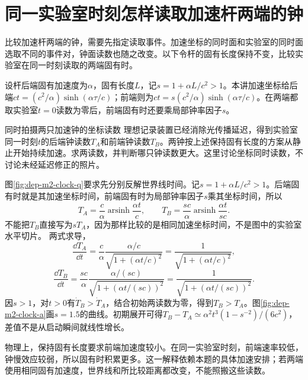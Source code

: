 \section{同一实验室时刻怎样读取加速杆两端的钟}
比较加速杆两端的钟，需要先指定读取事件。加速坐标的同时面和实验室的同时面选取不同的事件对，钟面读数也随之改变。以下令杆的固有长度保持不变，比较实验室在同一时刻读取的两端固有时。

设杆后端固有加速度为$\alpha$，固有长度$L$，记$s=1+\alpha L/c^2>1$。本讲加速坐标给后端$ct=(c^2/\alpha)\sinh(\alpha\tau/c)$；前端则为$ct=s(c^2/\alpha)\sinh(\alpha\tau/c)$。在两端都取实验室$t=0$读数为零后，前端固有时还要乘局部钟率因子$s$。

\begin{example}同时拍摄两只加速钟的坐标读数
理想记录装置已经消除光传播延迟，得到实验室同一时刻$t$的后端钟读数$T_A$和前端钟读数$T_B$。两钟按上述保持固有长度的方案从静止开始持续加速。求两读数，并判断哪只钟读数更大。这里讨论坐标同时读数，不讨论未经延迟修正的照片。
\end{example}
\begin{solution}
图\ref{fig:dep-m2-clock-q}要求先分别反解世界线时间。记$s=1+\alpha L/c^2>1$。后端固有时就是其加速坐标时间，前端固有时为局部钟率因子$s$乘其坐标时间，所以
\[
 T_A=\frac c\alpha\operatorname{arsinh}\frac{\alpha t}{c},\qquad
 T_B=\frac{sc}{\alpha}\operatorname{arsinh}\frac{\alpha t}{sc}.
\]
不能把$T_B$直接写为$sT_A$，因为那样比较的是相同加速坐标时间，不是图中的实验室水平切片。
两式求导，
\[
 \frac{\dd T_A}{\dd t}
 =\frac c\alpha\frac{\alpha/c}{\sqrt{1+(\alpha t/c)^2}}
 =\frac1{\sqrt{1+(\alpha t/c)^2}},
\]
\[
 \frac{\dd T_B}{\dd t}
 =\frac{sc}\alpha\frac{\alpha/(sc)}{\sqrt{1+(\alpha t/(sc))^2}}
 =\frac1{\sqrt{1+(\alpha t/(sc))^2}}.
\]
因$s>1$，对$t>0$有$\dot T_B>\dot T_A$，结合初始两读数为零，得到$T_B>T_A$。图\ref{fig:dep-m2-clock-a}画$s=1.5$的曲线。初期展开可得$T_B-T_A\simeq\alpha^2t^3(1-s^{-2})/(6c^2)$，差值不是从启动瞬间就线性增长。

物理上，保持固有长度要求前端加速度较小。在同一实验室时刻，前端速率较低，钟慢效应较弱，所以固有时积累更多。这一解释依赖本题的具体加速安排；若两端使用相同固有加速度，世界线和所比较距离都改变，不能照搬这些读数。
\end{solution}
